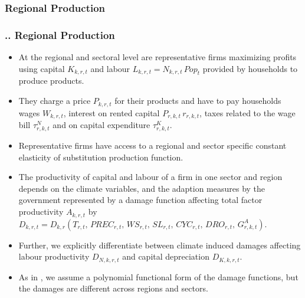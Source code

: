 \documentclass[11pt,aspectratio=169]{beamer}
\begin{document}
\subsubsection{Regional Production}
\begin{frame}
\frametitle{{\thesection.\thesubsection.\thesubsubsection} Regional Production}
\scriptsize
\begin{itemize}
\item At the regional and sectoral level are representative firms maximizing profits using capital $K_{k,r,t}$ and labour $L_{k,r,t} = N_{k,r,t} \, Pop_{t}$ provided by households to produce products. 
\item They charge a price $P_{k,r,t}$ for their products and have to pay households wages $W_{k,r,t}$, interest on rented capital $P_{r,k,t} \, r_{r,k,t}$, taxes related to the wage bill $\tau^{N}_{r,k,t}$ and on capital expenditure $\tau^{K}_{r,k,t}$.
\item Representative firms have access to a regional and sector specific constant elasticity of substitution production function.
\item The productivity of capital and labour of a firm in one sector and region depends on the climate variables, and the adaption measures by the government represented by a damage function affecting total factor productivity $A_{k,r,t}$ by $D_{k,r,t} = D_{k,r}\left(T_{r,t}, \, PREC_{r,t}, \, WS_{r,t}, \, SL_{r,t}, \, CYC_{r,t}, \, DRO_{r,t}, \, G^{A}_{r,k,t} \right)$.
\item Further, we explicitly differentiate between climate induced damages affecting labour productivity $D_{N,k,r,t}$ and capital depreciation $D_{K,k,r,t}$. 
\item As in \cite{nordhaus1993optimal}, we assume a polynomial functional form of the damage functions, but the damages are different across regions and sectors.
\end{itemize}
\end{frame}
\end{document}
